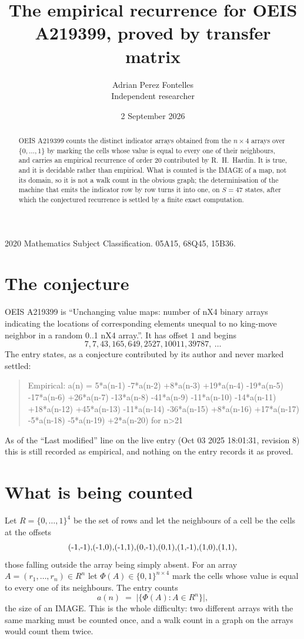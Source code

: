 \documentclass[11pt,a4paper]{article}
\title{The empirical recurrence for OEIS A219399, proved by transfer matrix}
\author{Adrian Perez Fontelles\\ \small Independent researcher}
\date{2 September 2026}
\theoremstyle{plain}
\theoremstyle{definition}
\begin{document}
\maketitle

\begin{abstract}
OEIS A219399 counts the distinct indicator arrays obtained from the $n\times4$ arrays over
$\{0,\dots,1\}$ by marking the cells whose value is equal to every one of their neighbours, and carries an
empirical recurrence of order $20$ contributed by R.~H.~Hardin. It is true, and it is
decidable rather than empirical. What is counted is the IMAGE of a map, not its domain, so it
is not a walk count in the obvious graph; the determinisation of the machine that emits the
indicator row by row turns it into one, on $S=47$ states, after which the conjectured
recurrence is settled by a finite exact computation.
\end{abstract}

\noindent\small 2020 Mathematics Subject Classification. 05A15, 68Q45, 15B36.\normalsize

\section{The conjecture}

OEIS A219399 is ``Unchanging value maps: number of nX4 binary arrays indicating the locations of corresponding elements unequal to no king-move neighbor in a random 0..1 nX4 array.''. It has offset $1$ and begins
\[
7, 7, 43, 165, 649, 2527, 10011, 39787,\ \dots
\]
The entry states, as a conjecture contributed by its author and never marked settled:
\begin{quote}
Empirical: a(n) = 5*a(n-1) -7*a(n-2) +8*a(n-3) +19*a(n-4) -19*a(n-5) -17*a(n-6) +26*a(n-7) -13*a(n-8) -41*a(n-9) -11*a(n-10) -14*a(n-11) +18*a(n-12) +45*a(n-13) -11*a(n-14) -36*a(n-15) +8*a(n-16) +17*a(n-17) -5*a(n-18) -5*a(n-19) +2*a(n-20) for n>21
\end{quote}
As of the ``Last modified'' line on the live entry (Oct 03 2025 18:01:31, revision 8) this is still
recorded as empirical, and nothing on the entry records it as proved.

\section{What is being counted}

Let $R=\{0,\dots,1\}^{4}$ be the set of rows and let the neighbours of a cell be the
cells at the offsets
\[
$(-1,-1)$, $(-1,0)$, $(-1,1)$, $(0,-1)$, $(0,1)$, $(1,-1)$, $(1,0)$, $(1,1)$,
\]
those falling outside the array being simply absent. For an array
$A=(r_1,\dots,r_n)\in R^n$ let $\Phi(A)\in\{0,1\}^{n\times4}$ mark the cells whose value
is equal to every one of its neighbours. The entry counts
\[
a(n)\;=\;\bigl|\{\Phi(A):A\in R^n\}\bigr| ,
\]
the size of an IMAGE. This is the whole difficulty: two different arrays with the same marking
must be counted once, and a walk count in a graph on the arrays would count them twice.
\end{document}
